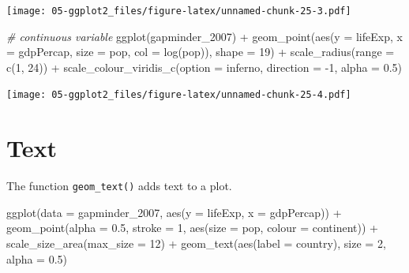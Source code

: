 \documentclass[
]{book}
\newenvironment{Shaded}{\begin{snugshade}}{\end{snugshade}}
\newcommand{\AttributeTok}[1]{\textcolor[rgb]{0.77,0.63,0.00}{#1}}
\newcommand{\CommentTok}[1]{\textcolor[rgb]{0.56,0.35,0.01}{\textit{#1}}}
\newcommand{\DecValTok}[1]{\textcolor[rgb]{0.00,0.00,0.81}{#1}}
\newcommand{\FloatTok}[1]{\textcolor[rgb]{0.00,0.00,0.81}{#1}}
\newcommand{\FunctionTok}[1]{\textcolor[rgb]{0.00,0.00,0.00}{#1}}
\newcommand{\NormalTok}[1]{#1}
\newcommand{\SpecialCharTok}[1]{\textcolor[rgb]{0.00,0.00,0.00}{#1}}
\newcommand{\StringTok}[1]{\textcolor[rgb]{0.31,0.60,0.02}{#1}}
\begin{document}
\texttt{[image: 05-ggplot2\_files/figure-latex/unnamed-chunk-25-3.pdf]}

\begin{Shaded}
\begin{Highlighting}[]
\CommentTok{\# continuous variable}
\FunctionTok{ggplot}\NormalTok{(gapminder\_2007) }\SpecialCharTok{+} 
  \FunctionTok{geom\_point}\NormalTok{(}\FunctionTok{aes}\NormalTok{(}\AttributeTok{y =}\NormalTok{ lifeExp, }\AttributeTok{x =}\NormalTok{ gdpPercap, }\AttributeTok{size =}\NormalTok{ pop, }\AttributeTok{col =} \FunctionTok{log}\NormalTok{(pop)), }\AttributeTok{shape =} \DecValTok{19}\NormalTok{) }\SpecialCharTok{+}
  \FunctionTok{scale\_radius}\NormalTok{(}\AttributeTok{range =} \FunctionTok{c}\NormalTok{(}\DecValTok{1}\NormalTok{, }\DecValTok{24}\NormalTok{)) }\SpecialCharTok{+}
  \FunctionTok{scale\_colour\_viridis\_c}\NormalTok{(}\AttributeTok{option =} \StringTok{\textquotesingle{}inferno\textquotesingle{}}\NormalTok{, }\AttributeTok{direction =} \SpecialCharTok{{-}}\DecValTok{1}\NormalTok{, }\AttributeTok{alpha =} \FloatTok{0.5}\NormalTok{)}
\end{Highlighting}
\end{Shaded}

\texttt{[image: 05-ggplot2\_files/figure-latex/unnamed-chunk-25-4.pdf]}

\hypertarget{text}{%
\section{Text}\label{text}}

The function \texttt{geom\_text()} adds text to a plot.

\begin{Shaded}
\begin{Highlighting}[]
\FunctionTok{ggplot}\NormalTok{(}\AttributeTok{data =}\NormalTok{ gapminder\_2007, }\FunctionTok{aes}\NormalTok{(}\AttributeTok{y =}\NormalTok{ lifeExp, }\AttributeTok{x =}\NormalTok{ gdpPercap)) }\SpecialCharTok{+} 
  \FunctionTok{geom\_point}\NormalTok{(}\AttributeTok{alpha =} \FloatTok{0.5}\NormalTok{, }\AttributeTok{stroke =} \DecValTok{1}\NormalTok{, }\FunctionTok{aes}\NormalTok{(}\AttributeTok{size =}\NormalTok{ pop, }\AttributeTok{colour =}\NormalTok{ continent)) }\SpecialCharTok{+}
  \FunctionTok{scale\_size\_area}\NormalTok{(}\AttributeTok{max\_size =} \DecValTok{12}\NormalTok{) }\SpecialCharTok{+}
  \FunctionTok{geom\_text}\NormalTok{(}\FunctionTok{aes}\NormalTok{(}\AttributeTok{label =}\NormalTok{ country), }\AttributeTok{size =} \DecValTok{2}\NormalTok{, }\AttributeTok{alpha =} \FloatTok{0.5}\NormalTok{)}
\end{Highlighting}
\end{Shaded}
\end{document}
